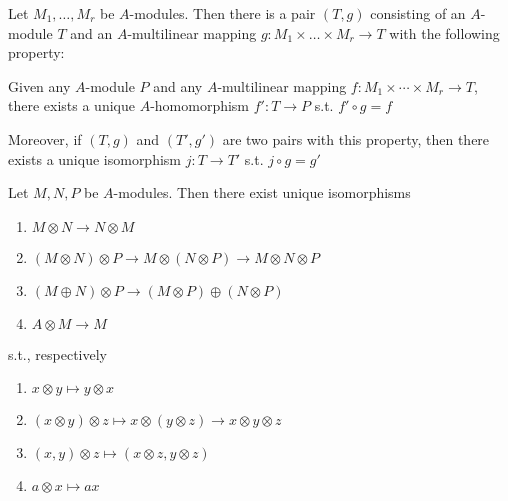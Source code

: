 \documentclass[11pt]{article}
\begin{document}
\begin{proposition}[]
\label{2.12s}
Let \(M_1,\dots,M_r\) be \(A\)-modules. Then there is a pair \((T,g)\) consisting of
an \(A\)-module \(T\) and an \(A\)-multilinear mapping \(g:M_1\times\dots\times M_r\to T\) with the following
property:

Given any \(A\)-module \(P\) and any \(A\)-multilinear mapping \(f:M_1\times\cdots\times M_r\to T\), there exists a
unique \(A\)-homomorphism \(f':T\to P\) s.t. \(f'\circ g=f\)

Moreover, if \((T,g)\) and \((T',g')\) are two pairs with this property, then there exists a
unique isomorphism \(j:T\to T'\) s.t. \(j\circ g=g'\)
\end{proposition}

\begin{proposition}[]
\label{2.14}
Let \(M,N,P\) be \(A\)-modules. Then there exist unique isomorphisms
\begin{enumerate}
\item \(M\otimes N\to N\otimes M\)
\item \((M\otimes N)\otimes P\to M\otimes(N\otimes P)\to M\otimes N\otimes P\)
\item \((M\oplus N)\otimes P\to(M\otimes P)\oplus(N\otimes P)\)
\item \(A\otimes M\to M\)
\end{enumerate}


s.t., respectively
\begin{enumerate}
\item \(x\otimes y\mapsto y\otimes x\)
\item \((x\otimes y)\otimes z\mapsto x\otimes(y\otimes z)\to x\otimes y\otimes z\)
\item \((x,y)\otimes z\mapsto(x\otimes z,y\otimes z)\)
\item \(a\otimes x\mapsto ax\)
\end{enumerate}
\end{proposition}
\end{document}
